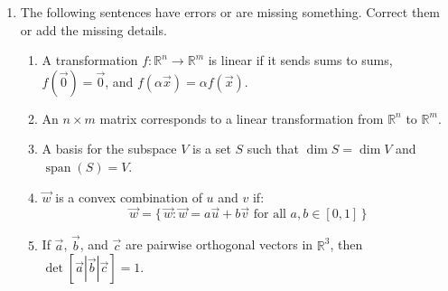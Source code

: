 \documentclass[red]{tutorial}
\newcommand{\R}{\mathbb{R}}
\newcommand{\mute}[1]{}
\DeclareMathOperator{\Span} {span}
\theoremstyle{definition}
\theoremstyle{theorem}
\begin{document}
\begin{tutorial}
  \begin{enumerate}
    \item The following sentences have errors or are missing 
      something. Correct them or add the missing details.
      \begin{enumerate}
        \item
          A transformation $f\colon\R^n\to \R^m$ is linear if 
          it sends sums to sums, $f(\vec0) = \vec0$, and 
          $f(\alpha \vec x) = \alpha f(\vec x)$.
        \item
          An $n\times m$ matrix corresponds to a linear 
          transformation from $\R^n$
          to $\R^m$.
        \item %
          A basis for the subspace $V$ is a set $S$ 
          such that $\dim S = \dim V$ and $\Span(S) = V$.
        \item
          $\vec w$ is a convex combination of $u$ and $v$ if:
          \begin{equation*}
            \vec w =
            \bigl\{\,\vec w:\vec w = a\vec u %
              +b\vec v \text{ for all } a,b\in [0,1]\,
            \bigr\}
          \end{equation*}
        \item %
          If $\vec a$, $\vec b$, and $\vec c$ are pairwise orthogonal 
          vectors in $\R^3$, then 
          $\det \left[\vec a|\vec b|\vec c\right] = 1$.
      \end{enumerate}
      \mute{
    \item %
      Sam has a function $T\colon\R^n\to \R^m$, which has the following
      property:
      \begin{center}
        For any subspace $V\subset \R^n$, we have $T(V)$ is a subspace of $\R^m$.
      \end{center}
      \begin{enumerate}
        \item What are the possible values of $T(\vec0)$?
        \item Sam says that their function is not linear. Can this be true?

\end{enumerate}}
\end{enumerate}
\end{tutorial}
\end{document}
